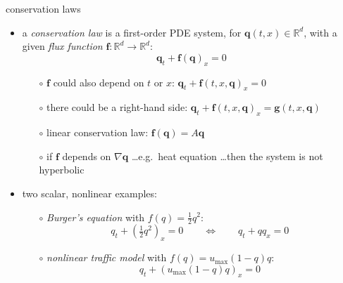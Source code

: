 \documentclass[10pt,hyperref,dvipsnames]{beamer}
\newcommand{\bbf}{\mathbf{f}}
\newcommand{\bg}{\mathbf{g}}
\newcommand{\bq}{\mathbf{q}}
\newcommand{\grad}{\nabla}
\newcommand{\RR}{\mathbb{R}}
\begin{document}
\begin{frame}{conservation laws}

\begin{itemize}
\item a \emph{conservation law} is a first-order PDE system, for $\bq(t,x) \in \RR^d$, with a given \emph{flux function} $\bbf:\RR^d\to \RR^d$:
  $$\bq_t + \bbf(\bq)_x=0$$
    \begin{itemize}
    \item[$\circ$] $\bbf$ could also depend on $t$ or $x$: \qquad $\bq_t + \bbf(t,x,\bq)_x=0$
    \item[$\circ$] there could be a right-hand side: \qquad $\bq_t + \bbf(t,x,\bq)_x=\bg(t,x,\bq)$
    \item[$\circ$] linear conservation law: \qquad $\bbf(\bq) = A\bq$
    \item[$\circ$] if $\bbf$ depends on $\grad \bq$ \dots e.g.~heat equation \dots then the system is not hyperbolic
    \end{itemize}

\bigskip
\item two scalar, nonlinear examples:
    \begin{itemize}
    \item[$\circ$] \emph{Burger's equation} with $f(q)=\frac{1}{2} q^2$:
        $$q_t + \left(\tfrac{1}{2} q^2\right)_x = 0 \qquad \iff \qquad q_t + q q_x = 0$$
    \item[$\circ$] \emph{nonlinear traffic model} with $f(q)=u_{\max} (1-q) q$:
        $$q_t + \left(u_{\max} (1-q) q\right)_x = 0$$
    \end{itemize}
\end{itemize}
\end{frame}
\end{document}
